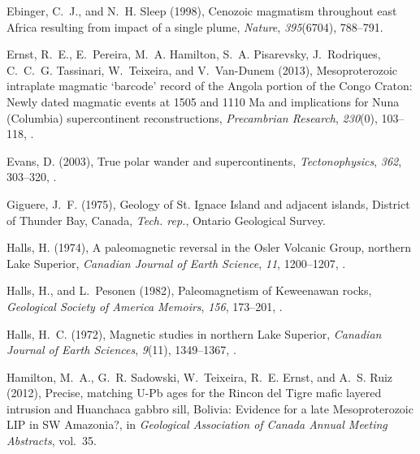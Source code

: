 \documentclass[draft,gc]{AGUTeX}
\begin{document}
\begin{article}
\begin{thebibliography}{24}
Ebinger, C.~J., and N.~H. Sleep (1998), Cenozoic magmatism throughout east
  Africa resulting from impact of a single plume, \textit{Nature},
  \textit{395}(6704), 788--791.

Ernst, R.~E., E.~Pereira, M.~A. Hamilton, S.~A. Pisarevsky, J.~Rodriques,
  C.~C.~G. Tassinari, W.~Teixeira, and V.~Van-Dunem (2013), {Mesoproterozoic
  intraplate magmatic `barcode' record of the Angola portion of the Congo
  Craton: Newly dated magmatic events at 1505 and 1110 Ma and implications for
  Nuna (Columbia) supercontinent reconstructions}, \textit{Precambrian
  Research}, \textit{230}(0), 103--118, .

Evans, D. (2003), True polar wander and supercontinents,
  \textit{Tectonophysics}, \textit{362}, 303--320,
  .

Giguere, J.~F. (1975), {Geology of St. Ignace Island and adjacent islands,
  District of Thunder Bay, Canada}, \textit{Tech. rep.}, Ontario Geological
  Survey.

Halls, H. (1974), A paleomagnetic reversal in the {O}sler {V}olcanic {G}roup,
  northern {L}ake {S}uperior, \textit{Canadian Journal of Earth Science},
  \textit{11}, 1200--1207, .

Halls, H., and L.~Pesonen (1982), Paleomagnetism of {K}eweenawan rocks,
  \textit{Geological Society of America Memoirs}, \textit{156}, 173--201,
  .

Halls, H.~C. (1972), Magnetic studies in northern {L}ake {S}uperior,
  \textit{Canadian Journal of Earth Sciences}, \textit{9}(11), 1349--1367,
  .

Hamilton, M.~A., G.~R. Sadowski, W.~Teixeira, R.~E. Ernst, and A.~S. Ruiz
  (2012), {Precise, matching U-Pb ages for the Rincon del Tigre mafic layered
  intrusion and Huanchaca gabbro sill, Bolivia: Evidence for a late
  Mesoproterozoic LIP in SW Amazonia?}, in \textit{Geological Association of
  Canada Annual Meeting Abstracts}, vol.~35.


\end{thebibliography}
\end{article}
\end{document}
